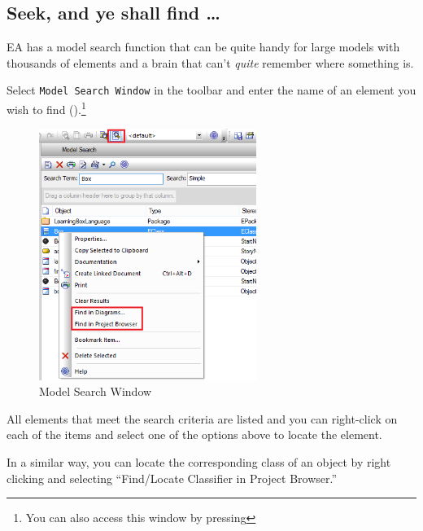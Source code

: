 \newpage

\hypertarget{subsec:seekAndFind}{}

\subsection{Seek, and ye shall find \ldots}

EA has a model search function that can be quite handy for large models with thousands of elements and a brain that can't \emph{quite} remember where something
is.

\begin{stepbystep}

\item Select \texttt{Model Search Window} in the toolbar and enter the name of an element you wish to find
().\footnote{You can also access this window by pressing
}

\vspace{0.5cm}

\begin{figure}[htbp]
\begin{center}
  \includegraphics[width=0.63\textwidth]{search1}
  \caption{Model Search Window}  
  \label{fig_search01}
\end{center}
\end{figure}

\item All elements that meet the search criteria are listed and you can right-click on each of the items and select one of the options
above to locate the element.

\item In a similar way, you can locate the corresponding class of an object by right clicking and selecting ``Find/Locate Classifier in
Project Browser.''

\vfill

\end{stepbystep}
